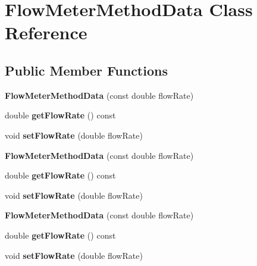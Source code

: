 \hypertarget{class_flow_meter_method_data}{}\section{Flow\+Meter\+Method\+Data Class Reference}
\label{class_flow_meter_method_data}
\subsection*{Public Member Functions}
\begin{DoxyCompactItemize}
\item 
\mbox{\label{class_flow_meter_method_data_a603805ba5b83f7df91594300c6b4ac99}} 
{\bfseries Flow\+Meter\+Method\+Data} (const double flow\+Rate)
\item 
\mbox{\label{class_flow_meter_method_data_a9a8adb775ec3f20b9fbdc8b732d17637}} 
double {\bfseries get\+Flow\+Rate} () const
\item 
\mbox{\label{class_flow_meter_method_data_a01b412e3d7fd871f945772f4ab0a9702}} 
void {\bfseries set\+Flow\+Rate} (double flow\+Rate)
\item 
\mbox{\label{class_flow_meter_method_data_a603805ba5b83f7df91594300c6b4ac99}} 
{\bfseries Flow\+Meter\+Method\+Data} (const double flow\+Rate)
\item 
\mbox{\label{class_flow_meter_method_data_a9a8adb775ec3f20b9fbdc8b732d17637}} 
double {\bfseries get\+Flow\+Rate} () const
\item 
\mbox{\label{class_flow_meter_method_data_a01b412e3d7fd871f945772f4ab0a9702}} 
void {\bfseries set\+Flow\+Rate} (double flow\+Rate)
\item 
\mbox{\label{class_flow_meter_method_data_a603805ba5b83f7df91594300c6b4ac99}} 
{\bfseries Flow\+Meter\+Method\+Data} (const double flow\+Rate)
\item 
\mbox{\label{class_flow_meter_method_data_a9a8adb775ec3f20b9fbdc8b732d17637}} 
double {\bfseries get\+Flow\+Rate} () const
\item 
\mbox{\label{class_flow_meter_method_data_a01b412e3d7fd871f945772f4ab0a9702}} 
void {\bfseries set\+Flow\+Rate} (double flow\+Rate)
\end{DoxyCompactItemize}


